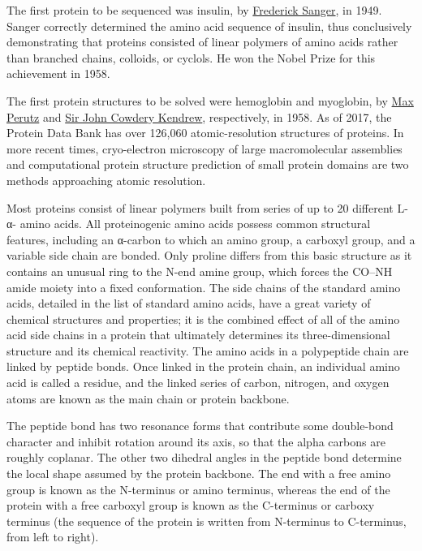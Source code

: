 The first protein to be sequenced was insulin, by \href{https://en.wikipedia.org/wiki/Frederick_Sanger}{Frederick Sanger}, in 1949. Sanger correctly determined the amino acid sequence of insulin, thus conclusively demonstrating that proteins consisted of linear polymers of amino acids rather than branched chains, colloids, or cyclols. He won the Nobel Prize for this achievement in 1958.

The first protein structures to be solved were hemoglobin and myoglobin, by \href{https://en.wikipedia.org/wiki/Max_Perutz}{Max Perutz} and \href{https://en.wikipedia.org/wiki/John_Kendrew}{Sir John Cowdery Kendrew}, respectively, in 1958. As of 2017, the Protein Data Bank has over 126,060 atomic-resolution structures of proteins. In more recent times, cryo-electron microscopy of large macromolecular assemblies and computational protein structure prediction of small protein domains are two methods approaching atomic resolution.

Most proteins consist of linear polymers built from series of up to 20 different L-α- amino acids. All proteinogenic amino acids possess common structural features, including an α-carbon to which an amino group, a carboxyl group, and a variable side chain are bonded. Only proline differs from this basic structure as it contains an unusual ring to the N-end amine group, which forces the CO--NH amide moiety into a fixed conformation. The side chains of the standard amino acids, detailed in the list of standard amino acids, have a great variety of chemical structures and properties; it is the combined effect of all of the amino acid side chains in a protein that ultimately determines its three-dimensional structure and its chemical reactivity. The amino acids in a polypeptide chain are linked by peptide bonds. Once linked in the protein chain, an individual amino acid is called a residue, and the linked series of carbon, nitrogen, and oxygen atoms are known as the main chain or protein backbone.

The peptide bond has two resonance forms that contribute some double-bond character and inhibit rotation around its axis, so that the alpha carbons are roughly coplanar. The other two dihedral angles in the peptide bond determine the local shape assumed by the protein backbone. The end with a free amino group is known as the N-terminus or amino terminus, whereas the end of the protein with a free carboxyl group is known as the C-terminus or carboxy terminus (the sequence of the protein is written from N-terminus to C-terminus, from left to right).

